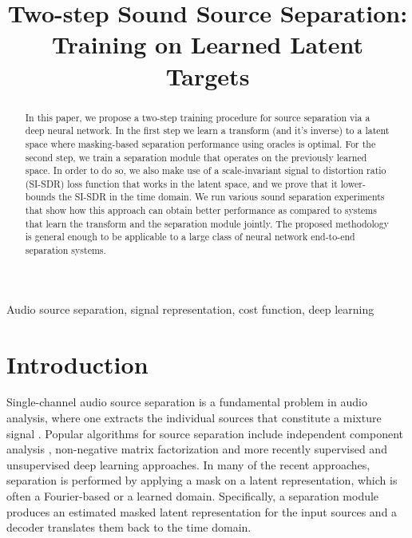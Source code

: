 \documentclass{article}
\title{Two-step Sound Source Separation: Training on Learned Latent Targets}
\begin{document}
\ninept
\maketitle
\begin{abstract}
In this paper, we propose a two-step training procedure for source separation via a deep neural network. In the first step we learn a transform (and it's inverse) to a latent space where masking-based separation performance using oracles is optimal. For the second step, we train a separation module that operates on the previously learned space. In order to do so, we also make use of a scale-invariant signal to distortion ratio (SI-SDR) loss function that works in the latent space, and we prove that it lower-bounds the SI-SDR in the time domain. We run various sound separation experiments that show how this approach can obtain better performance as compared to systems that learn the transform and the separation module jointly. The proposed methodology is general enough to be applicable to a large class of neural network end-to-end separation systems. \end{abstract}
\begin{keywords}
Audio source separation, signal representation, cost function, deep learning
\end{keywords}
\section{Introduction}
\label{sec:intro}
Single-channel audio source separation is a fundamental problem in audio analysis, where one extracts the individual sources that constitute a mixture signal \cite{belouchrani1998blindsourceseparationTFrepresentations}. Popular algorithms for source separation include independent component analysis \cite{choi2005blindICA}, non-negative matrix factorization \cite{le2015deepNMF} and more recently supervised \cite{huang2014deep, hershey2016deepclustering, UNETS, luo2019convTasNet, wang2019deepPhaseReconSpeakerSep} and unsupervised \cite{tzinis2019unsupervised, seetharaman2019bootstrapping, drude2019unsupervised} deep learning approaches. In many of the recent approaches, separation is performed by applying a mask on a latent representation, which is often a Fourier-based or a learned domain. Specifically, a separation module produces an estimated masked latent representation for the input sources and a decoder translates them back to the time domain.
\end{document}
